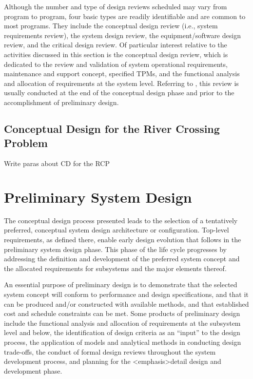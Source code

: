 Although the number and type of design reviews scheduled may vary from program to program, four basic types are readily identifiable and are common to most programs. They include the conceptual design review (i.e., system requirements review), the system design review, the equipment/software design review, and the critical design review. Of particular interest relative to the activities discussed in this section is the conceptual design review, which is dedicated to the review and validation of system operational requirements, maintenance and support concept, specified TPMs, and the functional analysis and allocation of requirements at the system level. Referring to , this review is usually conducted at the end of the conceptual design phase and prior to the accomplishment of preliminary design.

\subsection{Conceptual Design for the River Crossing Problem}

Write paras about CD for the RCP


\section{Preliminary System Design}

The conceptual design process presented leads to the selection of a tentatively preferred, conceptual system design architecture or configuration. Top-level requirements, as defined there, enable early design evolution that follows in the preliminary system design phase. This phase of the life cycle progresses by addressing the definition and development of the preferred system concept and the allocated requirements for subsystems and the major elements thereof.

An essential purpose of preliminary design is to demonstrate that the selected system concept will conform to performance and design specifications, and that it can be produced and/or constructed with available methods, and that established cost and schedule constraints can be met. Some products of preliminary design include the functional analysis and allocation of requirements at the subsystem level and below, the identification of design criteria as an ``input'' to the design process, the application of models and analytical methods in conducting design trade-offs, the conduct of formal design reviews throughout the system development process, and planning for the <emphasis>detail design and development phase.

